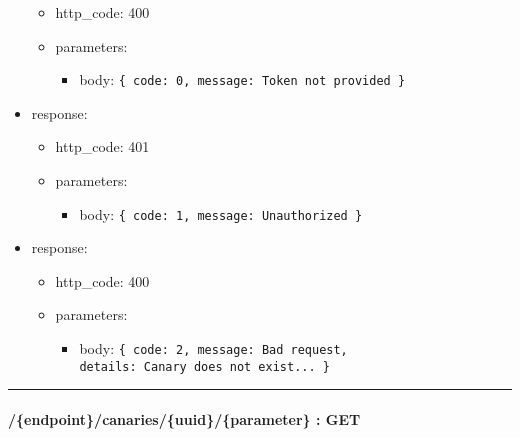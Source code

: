 \documentclass[
]{article}
\begin{document}
\begin{itemize}
  \begin{itemize}
  \item
    http\_code: 400
  \item
    parameters:

    \begin{itemize}
    \item
      body: \texttt{\{
      \textquotesingle{}code\textquotesingle{}:\ 0,\ 
      \textquotesingle{}message\textquotesingle{}:\ \textquotesingle{}Token\ not\ provided\textquotesingle{}
      \}}
    \end{itemize}
  \end{itemize}
\item
  response:

  \begin{itemize}
  \item
    http\_code: 401
  \item
    parameters:

    \begin{itemize}
    \item
      body: \texttt{\{
      \textquotesingle{}code\textquotesingle{}:\ 1,\ 
      \textquotesingle{}message\textquotesingle{}:\ \textquotesingle{}Unauthorized\textquotesingle{}
      \}}
    \end{itemize}
  \end{itemize}
\item
  response:

  \begin{itemize}
  \item
    http\_code: 400
  \item
    parameters:

    \begin{itemize}
    \item
      body: \texttt{\{
      \textquotesingle{}code\textquotesingle{}:\ 2,
      \textquotesingle{}message\textquotesingle{}:\ \textquotesingle{}Bad\ request\textquotesingle{},
      \textquotesingle{}details\textquotesingle{}:\ \textquotesingle{}Canary\ does\ not\ exist...\textquotesingle{}
      \}}
    \end{itemize}
  \end{itemize}
\end{itemize}

\begin{center}\rule{0.5\linewidth}{0.5pt}\end{center}

\hypertarget{header-n61459}{%
\paragraph{/\{endpoint\}/canaries/\{uuid\}/\{parameter\} :
GET}\label{header-n61459}}
\end{document}
